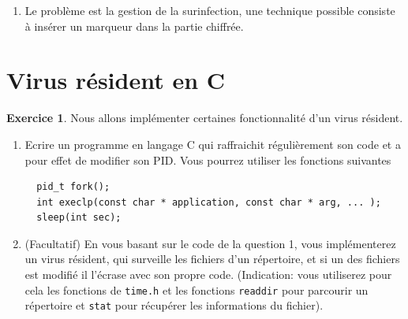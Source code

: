 \documentclass[a4paper,11pt]{article}
\theoremstyle{plain}
\theoremstyle{definition}
\newtheorem{exercice}{Exercice}
\begin{document}
\begin{correction}
\begin{enumerate}
\item Le problème est la gestion de la surinfection, une technique possible consiste à  insérer un marqueur dans la partie chiffrée.
\end{enumerate}
\end{correction}

\section{Virus résident en C}

\begin{exercice} Nous allons implémenter certaines fonctionnalité d'un virus résident.
\begin{enumerate}
\item Ecrire un programme en langage C qui  raffraichit régulièrement son code et a pour effet de modifier son PID. Vous pourrez utiliser les fonctions suivantes
\begin{verbatim}
  pid_t fork();
  int execlp(const char * application, const char * arg, ... );
  sleep(int sec);
\end{verbatim}
\item (Facultatif) En vous basant sur le code de la question 1, vous implémenterez un virus résident, qui surveille les fichiers d'un répertoire, et si un des fichiers est modifié il l'écrase avec son propre code. (Indication: vous utiliserez pour cela les fonctions de \texttt{time.h} et les fonctions \texttt{readdir} pour parcourir un répertoire et \texttt{stat} pour récupérer les informations du fichier).
\end{enumerate}
\end{exercice}
\end{document}
